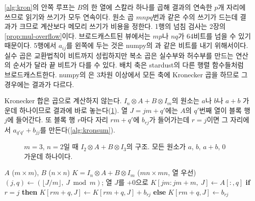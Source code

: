 \cref{alg:kron}의 안쪽 루프는 $B$의 한 열에 스칼라 하나를 곱해 결과의 연속한 $p$개 자리에 쓰므로 읽기와 쓰기가 모두 연속이다. 원소 곱 $mnpq$번과 같은 수의 쓰기가 드는데 결과가 크므로 계산보다 메모리 쓰기가 비용을 정한다. 1행의 넘침 검사는 2장의 \cref{prop:mul-overflow}이다. 브로드캐스트된 뷰에서는 $mp$나 $nq$가 64비트를 넘을 수 있기 때문이다. 5행에서 $a_{ij}$를 왼쪽에 두는 것은 numpy의 과 같은 비트를 내기 위해서이다. 실수 곱은 교환법칙이 비트까지 성립하지만 복소 곱은 실수부와 허수부를 만드는 연산의 순서가 달라 끝 비트가 다를 수 있다. 배치 축은 stardust의 다른 행렬 함수들처럼 브로드캐스트한다. numpy의 은 3차원 이상에서 모든 축에 Kronecker 곱을 하므로 그 경우에는 결과가 다르다.

Kronecker 합은 곱으로 계산하지 않는다. $I_n\otimes A+B\otimes I_m$의 원소는 $a$나 $b$나 $a+b$ 가운데 하나이므로 결과에 바로 놓는다(\cref{fig:kronsum}). 열 $J=jm+q'$에는 $A$의 $q'$번째 열이 블록 행 $j$에 들어간다. 또 블록 행 $r$마다 자리 $rm+q'$에 $b_{rj}$가 들어가는데 $r=j$이면 그 자리에서 $a_{q'q'}+b_{jj}$를 만든다(\cref{alg:kronsum}).

\begin{figure}[htbp]
\centering
{}
\caption{$m=3$, $n=2$일 때 $I_2\otimes A+B\otimes I_3$의 구조. 모든 원소가 $a$, $b$, $a+b$, $0$ 가운데 하나이다.}
\label{fig:kronsum}
\end{figure}

\begin{algorithm}[htbp]
\begin{algorithmic}[1]
\Require $A$ ($m\times m$), $B$ ($n\times n$)
\Ensure $K=I_n\otimes A+B\otimes I_m$ ($mn\times mn$, 열 우선)
 
  \State $(j,q)\gets(\lfloor J/m\rfloor,\ J\bmod m)$; 열 $J$를 $+0$으로 
  \State $K[jm:jm+m,\ J]\gets A[:,q]$
    \State \textbf{if} $r=j$ \textbf{then} $K[rm+q,J]\gets K[rm+q,J]+b_{rj}$ \textbf{else} $K[rm+q,J]\gets b_{rj}$
  \EndFor
\EndFor
\end{algorithmic}
\caption{Kronecker 합 (stardust )}
\label{alg:kronsum}
\end{algorithm}

